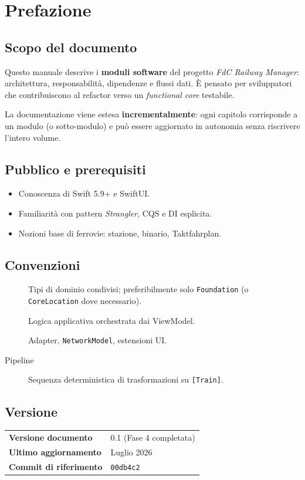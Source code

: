 \chapter{Prefazione}

\section{Scopo del documento}

Questo manuale descrive i \textbf{moduli software} del progetto
\emph{FdC Railway Manager}: architettura, responsabilità, dipendenze
e flussi dati. È pensato per sviluppatori che contribuiscono al
refactor verso un \emph{functional core} testabile.

La documentazione viene estesa \textbf{incrementalmente}: ogni capitolo
corrisponde a un modulo (o sotto-modulo) e può essere aggiornato in
autonomia senza riscrivere l'intero volume.

\section{Pubblico e prerequisiti}

\begin{itemize}
  \item Conoscenza di Swift 5.9+ e SwiftUI.
  \item Familiarità con pattern \emph{Strangler}, CQS e DI esplicita.
  \item Nozioni base di ferrovie: stazione, binario, Taktfahrplan.
\end{itemize}

\section{Convenzioni}

\begin{description}
  \item[] Tipi di dominio condivisi; preferibilmente
    solo \texttt{Foundation} (o \texttt{CoreLocation} dove necessario).
  \item[] Logica applicativa orchestrata dai ViewModel.
  \item[] Adapter, \texttt{NetworkModel}, estensioni UI.
  \item[Pipeline] Sequenza deterministica di trasformazioni su \texttt{[Train]}.
\end{description}

\section{Versione}

\begin{center}
\begin{tabular}{ll}
  \toprule
  \textbf{Versione documento} & 0.1 (Fase 4 completata) \\
  \textbf{Ultimo aggiornamento}  & Luglio 2026 \\
  \textbf{Commit di riferimento} & \texttt{00db4c2} \\
  \bottomrule
\end{tabular}
\end{center}
